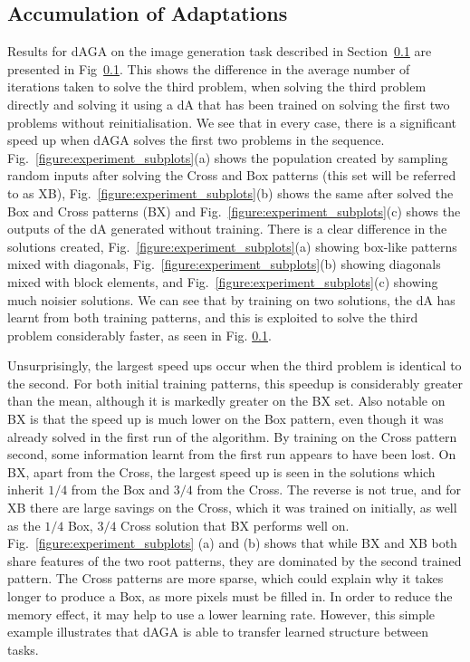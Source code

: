 \documentclass[runningheads,a4paper]{llncs}
\begin{document}
\subsection{Accumulation of Adaptations}
Results for dAGA on the image generation task described in Section~\ref{} are presented in Fig~\ref{}. This shows the difference in the average number of iterations taken to solve the third problem, when solving the third problem directly and solving it using a dA that has been trained on solving the first two problems without reinitialisation. We see that in every case, there is a significant speed up when dAGA solves the first two problems in the sequence. Fig.~\ref{figure:experiment_subplots}(a) shows the population created by sampling random inputs after solving the Cross and Box patterns (this set will be referred to as XB), Fig.~\ref{figure:experiment_subplots}(b) shows the same after solved the Box and Cross patterns (BX) and Fig.~\ref{figure:experiment_subplots}(c) shows the outputs of the dA generated without training. There is a clear difference in the solutions created, Fig.~\ref{figure:experiment_subplots}(a) showing box-like patterns mixed with diagonals, Fig.~\ref{figure:experiment_subplots}(b) showing diagonals mixed with block elements, and Fig.~\ref{figure:experiment_subplots}(c) showing much noisier solutions. We can see that by training on two solutions, the dA has learnt from both training patterns, and this is exploited to solve the third problem considerably faster, as seen in Fig. \ref{}.

Unsurprisingly, the largest speed ups occur when the third problem is identical to the second. For both initial training patterns, this speedup is considerably greater than the mean, although it is markedly greater on the BX set. Also notable on BX is that the speed up is much lower on the Box pattern, even though it was already solved in the first run of the algorithm. By training on the Cross pattern second, some information learnt from the first run appears to have been lost. On BX, apart from the Cross, the largest speed up is seen in the solutions which inherit \(1/4\) from the Box and \(3/4\) from the Cross. The reverse is not true, and for XB there are large savings on the Cross, which it was trained on initially, as well as the \(1/4\) Box, \(3/4\) Cross solution that BX performs well on. Fig.~\ref{figure:experiment_subplots} (a) and (b) shows that while BX and XB both share features of the two root patterns, they are dominated by the second trained pattern. The Cross patterns are more sparse, which could explain why it takes longer to produce a Box, as more pixels must be filled in. In order to reduce the memory effect, it may help to use a lower learning rate. However, this simple example illustrates that dAGA is able to transfer learned structure between tasks.
\end{document}
